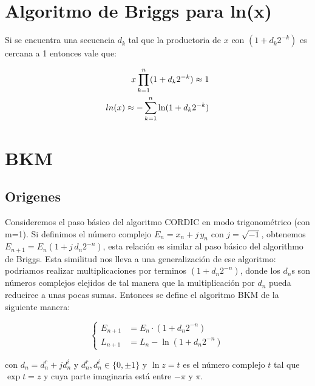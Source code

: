 \documentclass[10pt,a4paper]{book}
\begin{document}
\chapter{Algoritmo de Briggs para ln(x)}

Si se encuentra una secuencia $d_k$ tal que la productoria de $x$ con $(1+d_k 2^{-k})$ es cercana a 1 entonces vale que:

\begin{equation} \label{eq:briggs_ln}
   \begin{subequations}
      \begin{aligned}
         x \prod_{k=1}^{n} (1+d_k 2^{-k}) \approx 1     \\
         ln(x) \approx - \sum_{k=1}^{n} \ln(1+d_k 2^{-k})
      \end{aligned}
   \end{subequations}
\end{equation}


\chapter{BKM}

   \section{Origenes}

   Consideremos el paso básico del algoritmo CORDIC en modo trigonométrico (con m=1).
   Si definimos el número complejo $E_n = x_n + j \, y_n$ con $j=\sqrt{-1}$, obtenemos $E_{n+1} = E_n (1+j \, d_n 2^{-n})$, esta relación es similar al paso básico del algorithmo de Briggs.
   Esta similitud nos lleva a una generalización de ese algoritmo: podriamos realizar multiplicaciones por terminos $(1+d_n 2^{-n})$, donde los $d_n$s son números complejos elejidos de tal manera que la multiplicación por $d_n$ pueda reducirce a unas pocas sumas.
   Entonces se define el algoritmo BKM de la siguiente manera:

\begin{equation} \label{eq:bkm_eqs}
   \left\{
      \begin{aligned}
         E_{n+1} &= E_n \cdot (1 + d_n 2^{-n})   \\
         L_{n+1} &= L_n - \ln(1 + d_n 2^{-n})
      \end{aligned}
   \right.
\end{equation}

   con $d_n = d_n^r + j d_n^i $ y $d_n^r, d_n^i \in \{ 0, \pm 1 \}$ y $\ln z = t$ es el número complejo $t$ tal que $\exp{t} = z$ y cuya parte imaginaria está entre $-\pi$ y $\pi$.
\end{document}

